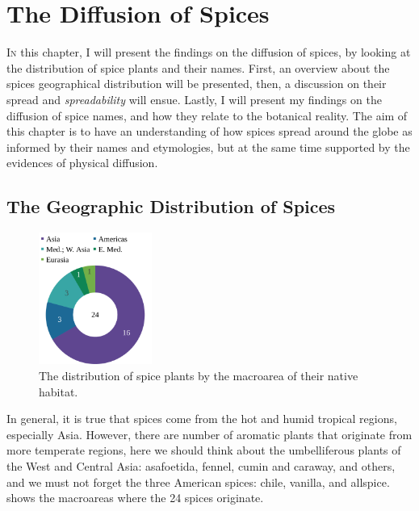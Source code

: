 \chapter{The Diffusion of Spices}
\label{ch:diffusion}




\lettrine[lines=\iniciale]{\textcolor{\accentcolor}{I}}{n} this chapter, I will present the findings on the diffusion of spices, by looking at the distribution of spice plants and their names. First, an overview about the spices geographical distribution will be presented, then, a discussion on their spread and \textit{spreadability} will ensue. Lastly, I will present my findings on the diffusion of spice names, and how they relate to the botanical reality. The aim of this chapter is to have an understanding of how spices spread around the globe as informed by their names and etymologies, but at the same time supported by the evidences of physical diffusion.

\section{The Geographic Distribution of Spices}

\begin{figure}
    \vspace{-\baselineskip}
    \includegraphics[width=0.33\textwidth]{imgs/plots/macroarea_pie.pdf}
    \caption{The distribution of spice plants by the macroarea of their native habitat.}
    \label{fig:macroarea_pie}
  \end{figure}
  
In general, it is true that spices come from the hot and humid tropical regions, especially Asia. However, there are number of aromatic plants that originate from more temperate regions, here we should think about the umbelliferous plants of the West and Central Asia: asafoetida, fennel, cumin and caraway, and others, and we must not forget the three American spices: chile, vanilla, and allspice.   shows the macroareas where the 24 spices originate.

